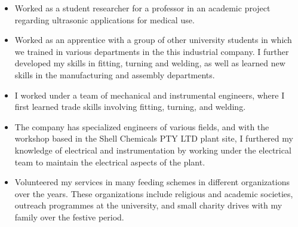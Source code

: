 \documentclass[10pt,a4paper]{altacv}
\begin{document}
\divider


\begin{itemize}
\item Worked as a student researcher for a professor in an academic project regarding ultrasonic applications for medical use.


\end{itemize}


\divider


\begin{itemize}
\item Worked as an apprentice with a group of other university students in which we trained in various departments in the this industrial company. I further developed my skills in fitting, turning and welding, as well as learned new skills in the manufacturing and assembly departments.


\end{itemize}


\divider


\begin{itemize}
\item I worked under a team of mechanical and instrumental engineers, where I first learned trade skills involving fitting, turning, and welding.
\item The company has specialized engineers of various fields, and with the workshop based in the Shell Chemicals PTY LTD plant site, I furthered my knowledge of electrical and instrumentation by working under the electrical team to maintain the electrical aspects of the plant.


\end{itemize}




\begin{itemize}
\item Volunteered my services in many feeding schemes in different organizations over the years. These
organizations include religious and academic societies, outreach programmes at the university, and
small charity drives with my family over the festive period. 
\end{itemize}
\end{document}
